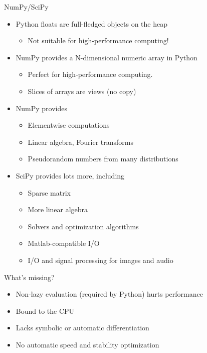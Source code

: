 \documentclass[utf8x,xcolor=pdftex,dvipsnames,table]{beamer}
\begin{document}
\begin{frame}{NumPy/SciPy}
  \begin{itemize}
  \item Python floats are full-fledged objects on the heap
      \begin{itemize}
      \item Not suitable for high-performance computing!
      \end{itemize}

  \item NumPy provides a N-dimensional numeric array in Python
      \begin{itemize}
      \item Perfect for high-performance computing.
      \item Slices of arrays are views (no copy)
      \end{itemize}

  \item NumPy provides
      \begin{itemize}
      \item Elementwise computations
      \item Linear algebra, Fourier transforms
      \item Pseudorandom numbers from many distributions
      \end{itemize}

  \item SciPy provides lots more, including
      \begin{itemize}
      \item Sparse matrix
      \item More linear algebra
      \item Solvers and optimization algorithms
      \item Matlab-compatible I/O
      \item I/O and signal processing for images and audio
      \end{itemize}
  \end{itemize}
\end{frame}

\begin{frame}{What's missing?}
  \begin{itemize}
    \item Non-lazy evaluation (required by Python) hurts performance
    \item Bound to the CPU
    \item Lacks symbolic or automatic differentiation
    \item No automatic speed and stability optimization
  \end{itemize}

\end{frame}
\end{document}
